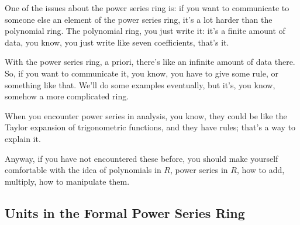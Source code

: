 \begin{speech}[00:31:28 - 00:32:38]

One of the issues about the power series ring is: if you want to communicate to someone else an element of the power series ring, it's a lot harder than the polynomial ring. The polynomial ring, you just write it: it's a finite amount of data, you know, you just write like seven coefficients, that's it.

With the power series ring, a priori, there's like an infinite amount of data there. So, if you want to communicate it, you know, you have to give some rule, or something like that. We'll do some examples eventually, but it's, you know, somehow a more complicated ring.

When you encounter power series in analysis, you know, they could be like the Taylor expansion of trigonometric functions, and they have rules; that's a way to explain it.

Anyway, if you have not encountered these before, you should make yourself comfortable with the idea of polynomials in $R$, power series in $R$, how to add, multiply, how to manipulate them.
\end{speech}

\begin{hidden}
\end{hidden}

\subsection{Units in the Formal Power Series Ring}

